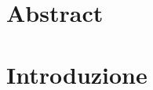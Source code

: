 \documentclass[12pt,oneside]{report}
\begin{document}
 
	                
	\begin{titlepage}
		
	\end{titlepage} 
    
	\chapter*{Abstract}
	
    \tableofcontents{}
    \newpage
    \chapter{Introduzione}
    
\end{document}
